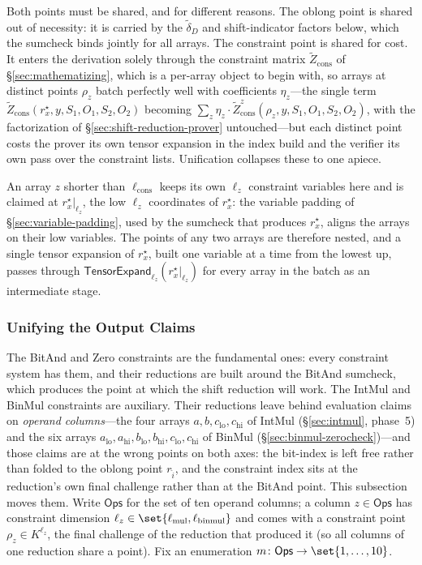 \documentclass{article}
\theoremstyle{definition}
\newcommand*{\mle}{\widetilde}
\begin{document}
Both points must be shared, and for different reasons. The oblong point is shared out of necessity: it is carried by the $\mle{\delta}_D$ and shift-indicator factors below, which the sumcheck binds jointly for all arrays. The constraint point is shared for cost. It enters the derivation solely through the constraint matrix $\mle{Z}_\text{cons}$ of \S\ref{sec:mathematizing}, which is a per-array object to begin with, so arrays at distinct points $\rho_z$ batch perfectly well with coefficients $\eta_z$---the single term $\mle{Z}_\text{cons}(r^\star_x, y, S_1, O_1, S_2, O_2)$ becoming $\sum_z \eta_z \cdot \mle{Z}^z_\text{cons}(\rho_z, y, S_1, O_1, S_2, O_2)$, with the factorization of \S\ref{sec:shift-reduction-prover} untouched---but each distinct point costs the prover its own tensor expansion in the index build and the verifier its own pass over the constraint lists. Unification collapses these to one apiece.

An array $z$ shorter than $\ell_\text{cons}$ keeps its own $\ell_z$ constraint variables here and is claimed at $r^\star_x|_{\ell_z}$, the low $\ell_z$ coordinates of $r^\star_x$: the variable padding of \S\ref{sec:variable-padding}, used by the sumcheck that produces $r^\star_x$, aligns the arrays on their low variables. The points of any two arrays are therefore nested, and a single tensor expansion of $r^\star_x$, built one variable at a time from the lowest up, passes through $\textsf{TensorExpand}_{\ell_z}(r^\star_x|_{\ell_z})$ for every array in the batch as an intermediate stage.

\subsubsection{Unifying the Output Claims}
\label{sec:rz-unification}

The BitAnd and Zero constraints are the fundamental ones: every constraint system has them, and their reductions are built around the BitAnd sumcheck, which produces the point at which the shift reduction will work. The IntMul and BinMul constraints are auxiliary. Their reductions leave behind evaluation claims on \emph{operand columns}---the four arrays $a, b, c_\text{lo}, c_\text{hi}$ of IntMul (\S\ref{sec:intmul}, phase~5) and the six arrays $a_\text{lo}, a_\text{hi}, b_\text{lo}, b_\text{hi}, c_\text{lo}, c_\text{hi}$ of BinMul (\S\ref{sec:binmul-zerocheck})---and those claims are at the wrong points on both axes: the bit-index is left free rather than folded to the oblong point $r_{\widehat{i}}$, and the constraint index sits at the reduction's own final challenge rather than at the BitAnd point. This subsection moves them. Write $\textsf{Ops}$ for the set of ten operand columns; a column $z \in \textsf{Ops}$ has constraint dimension $\ell_z \in \set{\ell_\text{mul}, \ell_\text{binmul}}$ and comes with a constraint point $\rho_z \in K^{\ell_z}$, the final challenge of the reduction that produced it (so all columns of one reduction share a point). Fix an enumeration $m \colon \textsf{Ops} \to \set{1, \ldots, 10}$.
\end{document}
